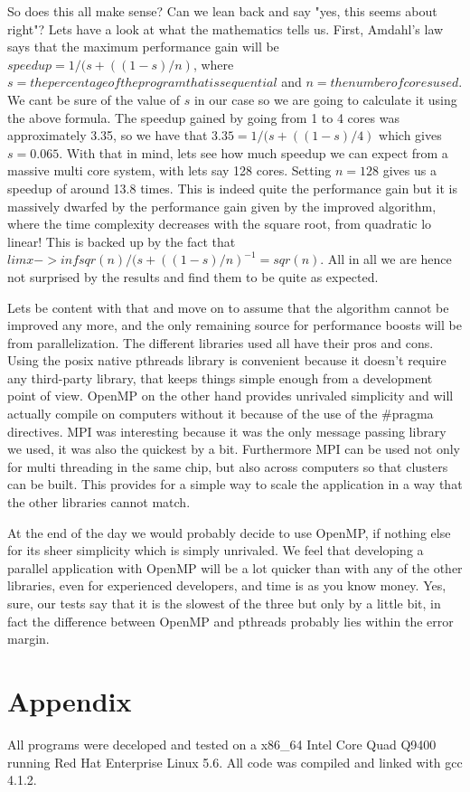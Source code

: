 \documentclass[11pt,a4paper]{article}
\begin{document}
So does this all make sense? Can we lean back and say "yes, this seems about right"? Lets have a look at what the mathematics tells us. First, Amdahl's law says that the maximum performance gain will be $speedup = 1/(s+((1 - s)/n)$, where $s = the percentage of the program that is sequential$ and $n = the number of cores used$. We cant be sure of the value of $s$ in our case so we are going to calculate it using the above formula. The speedup gained by going from 1 to 4 cores was approximately 3.35, so we have that $3.35 = 1/(s+((1 - s)/4)$ which gives $s = 0.065$. With that in mind, lets see how much speedup we can expect from a massive multi core system, with lets say 128 cores. Setting $n = 128$ gives us a speedup of around 13.8 times. This is indeed quite the performance gain but it is massively dwarfed by the performance gain given by the improved algorithm, where the time complexity decreases with the square root, from quadratic lo linear! This is backed up by the fact that $lim x -> inf sqr(n)/(s+((1 - s)/n)^{-1} = sqr(n)$. All in all we are hence not surprised by the results and find them to be quite as expected.

Lets be content with that and move on to assume that the algorithm cannot be improved any more, and the only remaining source for performance boosts will be from parallelization. The different libraries used  all have their pros and cons. Using the posix native pthreads library is convenient because it doesn't require any third-party library, that keeps things simple enough from a development point of view. OpenMP on the other hand provides unrivaled simplicity and will actually compile on computers without it because of the use of the \#pragma directives. MPI was interesting because it was the only message passing library we used, it was also the quickest by a bit. Furthermore MPI can be used not only for multi threading in the same chip, but also across computers so that clusters can be built. This provides for a simple way to scale the application in a way that the other libraries cannot match.

At the end of the day we would probably decide to use OpenMP, if nothing else for its sheer simplicity which is simply unrivaled. We feel that developing a parallel application with OpenMP will be a lot quicker than with any of the other libraries, even for experienced developers, and time is as you know money. Yes, sure, our tests say that it is the slowest of the three but only by a little bit, in fact the difference between OpenMP and pthreads probably lies within the error margin.
\section{Appendix}
All programs were deceloped and tested on a x86\_64 Intel Core Quad Q9400 running Red Hat Enterprise Linux 5.6. All code was compiled and linked with gcc 4.1.2. 
\end{document}
